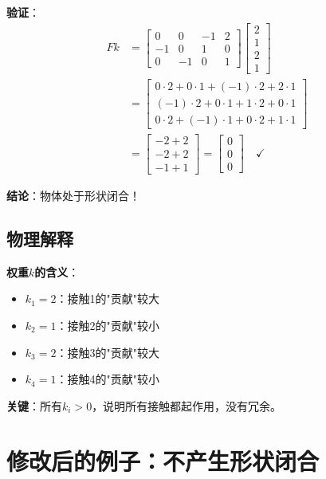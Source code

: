 \documentclass[12pt,a4paper]{article}
\begin{document}
\textbf{验证}：
\begin{align}
F k &= \begin{bmatrix} 0 & 0 & -1 & 2 \\ -1 & 0 & 1 & 0 \\ 0 & -1 & 0 & 1 \end{bmatrix} \begin{bmatrix} 2 \\ 1 \\ 2 \\ 1 \end{bmatrix} \\
&= \begin{bmatrix} 0 \cdot 2 + 0 \cdot 1 + (-1) \cdot 2 + 2 \cdot 1 \\ (-1) \cdot 2 + 0 \cdot 1 + 1 \cdot 2 + 0 \cdot 1 \\ 0 \cdot 2 + (-1) \cdot 1 + 0 \cdot 2 + 1 \cdot 1 \end{bmatrix} \\
&= \begin{bmatrix} -2 + 2 \\ -2 + 2 \\ -1 + 1 \end{bmatrix} = \begin{bmatrix} 0 \\ 0 \\ 0 \end{bmatrix} \quad \checkmark
\end{align}

\textbf{结论}：物体处于形状闭合！

\subsection{物理解释}

\textbf{权重$k$的含义}：
\begin{itemize}
\item $k_1 = 2$：接触1的"贡献"较大
\item $k_2 = 1$：接触2的"贡献"较小
\item $k_3 = 2$：接触3的"贡献"较大
\item $k_4 = 1$：接触4的"贡献"较小
\end{itemize}

\textbf{关键}：所有$k_i > 0$，说明所有接触都起作用，没有冗余。

\section{修改后的例子：不产生形状闭合}
\end{document}
